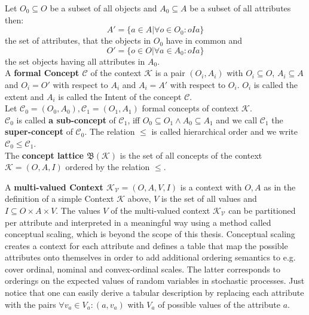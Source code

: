 Let $O_0 \subseteq O$ be a subset of all objects and $A_0 \subseteq A$ be a subset of all attributes then:
\[ A' = \{ a \in A | \forall o \in O_0: oIa \}  \]
the set of attributes, that the objects in $O_0$ have in common and 
\[ O' = \{ o \in O | \forall a \in A_0: oIa \} \]
the set objects having all attributes in $A_0$. \\

A \textbf{formal Concept $\mathcal{C}$} of the context $\mathcal{K}$ is a pair $(O_i, A_i)$ with $O_i \subseteq O$,  $A_i \subseteq A$ and $O_i = O'$ with respect to $A_i$ and $A_i = A'$ with respect to $O_i$. $O_i$ is called the extent and $A_i$ is called the Intent of the concept $\mathcal{C}$. \\

Let $\mathcal{C}_0 = (O_0, A_0), \mathcal{C}_1 =(O_1, A_1)$ formal concepts of context $\mathcal{K}$.\\
$\mathcal{C}_0$ is called \textbf{a sub-concept} of $\mathcal{C}_1$, iff $O_0 \subseteq O_1 \wedge A_0 \subseteq A_1$ and we call $\mathcal{C}_1$ the \textbf{super-concept} of $\mathcal{C}_0$. The relation $\leq$ is called hierarchical order and we write $\mathcal{C}_0 \leq \mathcal{C}_1$.  \\
The \textbf{concept lattice $\mathfrak{B}(\mathcal{K})$} is the set of all concepts of the context $\mathcal{K} =(O, A, I)$ ordered by the relation $\leq$. \\


A \textbf{multi-valued Context $\mathcal{K_V} = (O, A, V, I)$} is a context with $O, A$ as in the definition of a simple Context $\mathcal{K}$ above, $V$ is the set of all values and $I \subseteq O \times A \times V$. The values $V$ of the multi-valued context $\mathcal{K_V}$ can be partitioned per attribute and interpreted in a meaningful way using a method called conceptual scaling, which is beyond the scope of this thesis. Conceptual scaling creates a context for each attribute and defines a table that map the possible attributes onto themselves in order to add additional ordering semantics to e.g. cover ordinal, nominal and convex-ordinal scales. The latter corresponds to orderings on the expected values of random variables in stochastic processes. Just notice that one can easily derive a tabular description by replacing each attribute with the pairs $\forall v_a \in V_a: (a, v_a)$ with $V_a$ of possible values of the attribute $a$. \\

